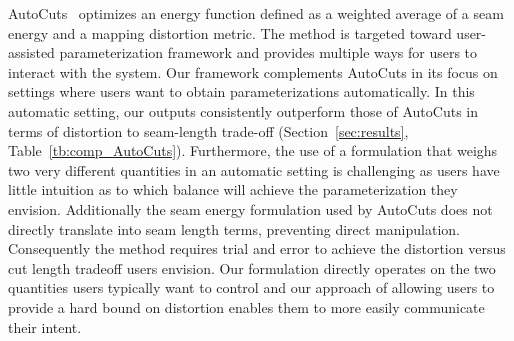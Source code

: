 AutoCuts~\cite{Poranne2017Autocuts} optimizes an energy function defined as a weighted average of a seam energy and a mapping distortion metric. 
The method is targeted toward user-assisted parameterization framework and provides multiple ways for users to interact with the system. Our framework complements AutoCuts in its focus on settings where users want to obtain parameterizations automatically. In this automatic setting,
our outputs consistently outperform those of AutoCuts in terms of distortion to seam-length trade-off (Section~\ref{sec:results}, Table~\ref{tb:comp_AutoCuts}). Furthermore, the use of a formulation that weighs two very different quantities  in an automatic setting is challenging as users have little intuition as to which balance will achieve the parameterization they envision. Additionally the seam energy formulation used by AutoCuts does not directly translate into seam length terms, preventing direct manipulation. Consequently the method requires trial and error to achieve the distortion versus cut length tradeoff users envision.  
Our formulation directly operates on the two quantities users typically want to control and our approach of allowing users to provide a hard bound on distortion enables them to more easily communicate their intent. 

%

